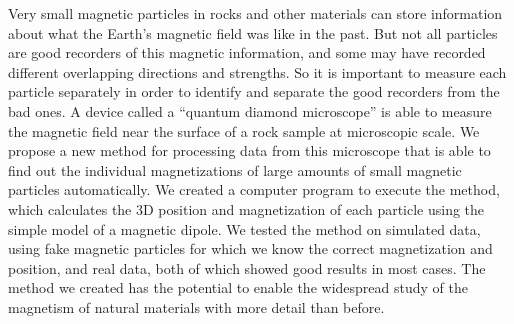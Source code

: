 Very small magnetic particles in rocks and other materials can store information about what the Earth’s magnetic field was like in the past. 
But not all particles are good recorders of this magnetic information, and some may have recorded different overlapping directions and strengths. 
So it is important to measure each particle separately in order to identify and separate the good recorders from the bad ones. 
A device called a ``quantum diamond microscope'' is able to measure the magnetic field near the surface of a rock sample at microscopic scale. 
We propose a new method for processing data from this microscope that is able to find out the individual magnetizations of large amounts of small magnetic particles automatically.
We created a computer program to execute the method, which calculates the 3D position and magnetization of each particle using the simple model of a magnetic dipole. 
We tested the method on simulated data, using fake magnetic particles for which we know the correct magnetization and position, and real data, both of which showed good results in most cases. 
The method we created has the potential to enable the widespread study of the magnetism of natural materials with more detail than before.